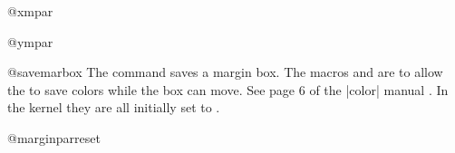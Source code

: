 %
 \begin{docCommand}{@xmpar} {}
    \begin{teX}
\long{}
    \end{teX}
 \end{docCommand}
%
 \begin{docCommand}{@ympar} {}
    \begin{teX}
\long{}
    \end{teX}
 \end{docCommand}
% 
 \begin{docCommand}{@savemarbox} {}
The command saves a margin box. The macros  and  are to
allow the  to save colors while the box can move. See page 6 of the |color| manual \cite{color}. In
the kernel they are all initially set to \cmd{\relax}.
    \begin{teX}
\long{}
    \end{teX}
 \end{docCommand}
% 
  \begin{docCommand}{@marginparreset} {}
%
%
    \begin{teX}
\def \@marginparreset {%
        \reset@font
        \normalsize
        \@setminipage
}
    \end{teX}
  \end{docCommand}
